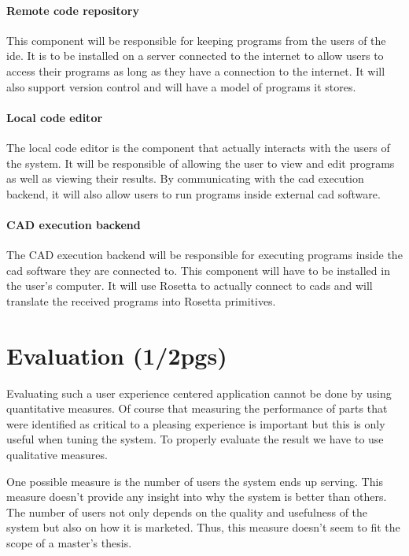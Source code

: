 \documentclass{./llncs2e/llncs}
\begin{document}
	\paragraph{Remote code repository}
		This component will be responsible for keeping programs from the users of the \ac{ide}.
		It is to be installed on a server connected to the internet to allow users to access their programs as long as they have a connection to the internet.
		It will also support version control and will have a model of programs it stores.
		
	\paragraph{Local code editor}
		The local code editor is the component that actually interacts with the users of the system.
		It will be responsible of allowing the user to view and edit programs as well as viewing their results.
		By communicating with the \ac{cad} execution backend, it will also allow users to run programs inside external \ac{cad} software.
		
	\paragraph{CAD execution backend}
		The CAD execution backend will be responsible for executing programs inside the \ac{cad} software they are connected to.
		This component will have to be installed in the user's computer.
		It will use Rosetta\cite{de2012modern} to actually connect to \ac{cad}s and will translate the received programs into Rosetta primitives.

\section{Evaluation (1/2pgs)}
	Evaluating such a user experience centered application cannot be done by using quantitative measures.
	Of course that measuring the performance of parts that were identified as critical to a pleasing experience is important but this is only useful when tuning the system. 
	To properly evaluate the result we have to use qualitative measures.

	One possible measure is the number of users the system ends up serving.
	This measure doesn't provide any insight into why the system is better than others. 
	The number of users not only depends on the quality and usefulness of the system but also on how it is marketed. 
	Thus, this measure doesn't seem to fit the scope of a master's thesis.
\end{document}
